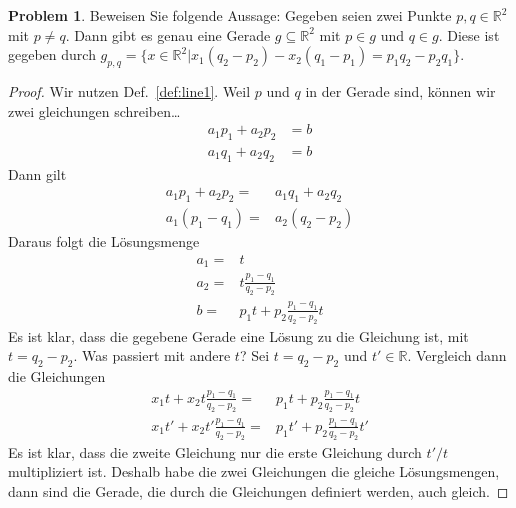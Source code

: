 \documentclass[prb,12pt]{revtex4-2}
\theoremstyle{definition}
\newtheorem{Problem}{Problem}
\theoremstyle{definition}
\newcommand{\R}{\mathbb{R}}
\begin{document}
\begin{Problem}\label{pr:linalg1-3}
	Beweisen Sie folgende Aussage:
Gegeben seien zwei Punkte $p, q \in \R^2$ mit $p \neq  q$. Dann gibt es genau eine Gerade $g \subseteq \R^2$ mit $p \in g$ und $q \in g$. Diese ist gegeben durch $g_{p,q} = \{x \in \R^2 |x_1 (q_2 - p_2 ) - x_2(q_1 - p_1 ) = p_1q_2-  p_2q_1\}$.
\end{Problem}

\begin{proof}
	Wir nutzen Def.~\ref{def:line1}. Weil $p$ und $q$ in der Gerade sind, können wir zwei gleichungen schreiben\ldots
	\begin{align*}
		a_1p_1+a_2p_2&=b\\
		a_1q_1+a_2q_2&=b
	\end{align*}
	Dann gilt
	\begin{align*}
		a_1p_1+a_2p_2=& a_1q_1+a_2q_2\\
		a_1(p_1-q_1)=& a_2(q_2-p_2)
	\end{align*}
	Daraus folgt die L\"{o}sungsmenge
	\begin{align*}
		a_1=&t\\
		a_2=&t\frac{p_1-q_1}{q_2-p_2}\\
		b=&p_1t+p_2\frac{p_1-q_1}{q_2-p_2}t
	\end{align*}
	Es ist klar, dass die gegebene Gerade eine Lösung zu die Gleichung ist, mit $t=q_2-p_2$. Was passiert mit andere $t$? Sei $t=q_2-p_2$ und $t'\in \R$. Vergleich dann die Gleichungen
	\begin{align*}
		x_1t+x_2t\frac{p_1-q_1}{q_2-p_2}=&p_1t+p_2\frac{p_1-q_1}{q_2-p_2}t\\
		x_1t'+x_2t'\frac{p_1-q_1}{q_2-p_2}=&p_1t'+p_2\frac{p_1-q_1}{q_2-p_2}t'
	\end{align*}
	Es ist klar, dass die zweite Gleichung nur die erste Gleichung durch $t' / t$ multipliziert ist. Deshalb habe die zwei Gleichungen die gleiche Lösungsmengen, dann sind die Gerade, die durch die Gleichungen definiert werden, auch gleich.
\end{proof}
\end{document}
